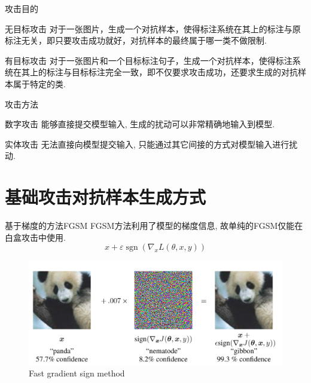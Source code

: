 \documentclass[UTF8, aspectratio=169, 10pt, t]{ctexbeamer}
\begin{document}
\begin{frame}{攻击目的}
	\begin{block}{无目标攻击}
		对于一张图片，生成一个对抗样本，使得标注系统在其上的标注与原标注无关，即只要攻击成功就好，对抗样本的最终属于哪一类不做限制. 
	\end{block}
	
	\begin{exampleblock}{有目标攻击}
		对于一张图片和一个目标标注句子，生成一个对抗样本，使得标注系统在其上的标注与目标标注完全一致，即不仅要求攻击成功，还要求\alert{生成的对抗样本属于特定的类}. 
	\end{exampleblock}
	
\end{frame}

\begin{frame}{攻击方法}
	\begin{block}{数字攻击}
		能够\alert{直接提交模型输入}, 生成的扰动可以非常精确地输入到模型.
	\end{block}
	
	\begin{exampleblock}{实体攻击}
		无法直接向模型提交输入, 只能通过其它\alert{间接的方式}对模型输入进行扰动.
	\end{exampleblock}
	
\end{frame}

\section{基础攻击对抗样本生成方式}

\begin{frame}{基于梯度的方法FGSM}
	FGSM方法利用了模型的梯度信息, 故单纯的FGSM仅能在白盒攻击中使用.
	\[
	x + \varepsilon \operatorname{sgn}(\nabla_x L(\theta,x,y))
	\]
	\begin{figure}
		\centering
		\includegraphics[height=0.5\textheight]{fgsm}
		\caption{Fast gradient sign method}
		\label{fig:fgsm}
	\end{figure}
	
\end{frame}
\end{document}
